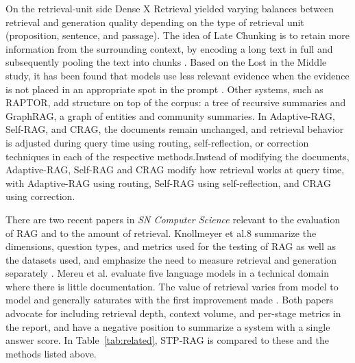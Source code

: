 \documentclass[10pt,a4paper]{article}
\begin{document}
On the retrieval-unit side Dense X Retrieval yielded varying balances between retrieval and generation quality depending on the type of retrieval unit (proposition, sentence, and passage). The idea of Late Chunking is to retain more information from the surrounding context, by encoding a long text in full and subsequently pooling the text into chunks \cite{chen2024densex,gunther2024latechunking}. Based on the Lost in the Middle study, it has been found that models use less relevant evidence when the evidence is not placed in an appropriate spot in the prompt \cite{liu2024lostmiddle}. Other systems, such as RAPTOR, add structure on top of the corpus: a tree of recursive summaries and GraphRAG, a graph of entities and community summaries. In Adaptive-RAG, Self-RAG, and CRAG, the documents remain unchanged, and retrieval behavior is adjusted during query time using routing, self-reflection, or correction techniques in each of the respective methods.Instead of modifying the documents, Adaptive-RAG, Self-RAG and CRAG modify how retrieval works at query time, with Adaptive-RAG using routing, Self-RAG using self-reflection, and CRAG using correction.

There are two recent papers in \emph{SN Computer Science} relevant to the evaluation of RAG and to the amount of retrieval. Knollmeyer et al.8 summarize the dimensions, question types, and metrics used for the testing of RAG as well as the datasets used, and emphasize the need to measure retrieval and generation separately \cite{knollmeyer2026evaluation}. Mereu et al. evaluate five language models in a technical domain where there is little documentation. The value of retrieval varies from model to model and generally saturates with the first improvement made \cite{mereu2026specializing}. Both papers advocate for including retrieval depth, context volume, and per-stage metrics in the report, and have a negative position to summarize a system with a single answer score. In Table~\ref{tab:related}, STP-RAG is compared to these and the methods listed above.
\end{document}
